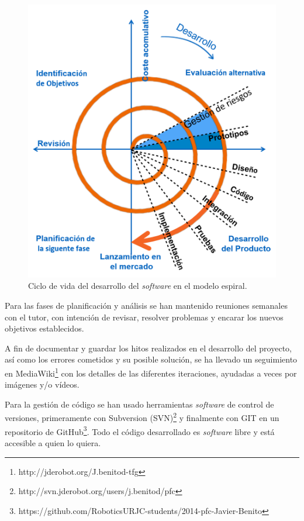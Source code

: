 \begin{figure}[th]
\centering
\includegraphics[scale=0.62]{Figures/spiral.png}
\decoRule
\caption[Ciclo de vida en espiral]{Ciclo de vida del desarrollo del \textit{software} en el modelo espiral.}
\label{fig:spiral}
\end{figure}

Para las fases de planificación y análisis se han mantenido reuniones semanales con el tutor, con intención de revisar, resolver problemas y encarar los nuevos objetivos establecidos.

A fin de documentar y guardar los hitos realizados en el desarrollo del proyecto, así como los errores cometidos y su posible solución, se ha llevado un seguimiento en MediaWiki\footnote{http://jderobot.org/J.benitod-tfg} con los detalles de las diferentes iteraciones, ayudadas a veces por imágenes y/o vídeos.

Para la gestión de código se han usado herramientas \textit{software} de control de versiones, primeramente con Subversion (SVN)\footnote{http://svn.jderobot.org/users/j.benitod/pfc} y finalmente con GIT en un repositorio de GitHub\footnote{https://github.com/RoboticsURJC-students/2014-pfc-Javier-Benito}. Todo el código desarrollado es \textit{software} libre y está accesible a quien lo quiera.

